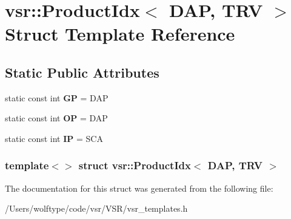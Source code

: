 \hypertarget{structvsr_1_1_product_idx_3_01_d_a_p_00_01_t_r_v_01_4}{\section{vsr\-:\-:Product\-Idx$<$ D\-A\-P, T\-R\-V $>$ Struct Template Reference}
\label{structvsr_1_1_product_idx_3_01_d_a_p_00_01_t_r_v_01_4}
}
\subsection*{Static Public Attributes}
\begin{DoxyCompactItemize}
\item 
\hypertarget{structvsr_1_1_product_idx_3_01_d_a_p_00_01_t_r_v_01_4_a4067d00598e5ca0019542c3eb1e23b21}{static const int {\bfseries G\-P} = D\-A\-P}\label{structvsr_1_1_product_idx_3_01_d_a_p_00_01_t_r_v_01_4_a4067d00598e5ca0019542c3eb1e23b21}

\item 
\hypertarget{structvsr_1_1_product_idx_3_01_d_a_p_00_01_t_r_v_01_4_a0e6cb96a6d7b1090725768a6b373da5b}{static const int {\bfseries O\-P} = D\-A\-P}\label{structvsr_1_1_product_idx_3_01_d_a_p_00_01_t_r_v_01_4_a0e6cb96a6d7b1090725768a6b373da5b}

\item 
\hypertarget{structvsr_1_1_product_idx_3_01_d_a_p_00_01_t_r_v_01_4_a9f386f9134ff0cc6b88bc1379ffae915}{static const int {\bfseries I\-P} = S\-C\-A}\label{structvsr_1_1_product_idx_3_01_d_a_p_00_01_t_r_v_01_4_a9f386f9134ff0cc6b88bc1379ffae915}

\end{DoxyCompactItemize}
\subsubsection*{template$<$$>$ struct vsr\-::\-Product\-Idx$<$ D\-A\-P, T\-R\-V $>$}



The documentation for this struct was generated from the following file\-:\begin{DoxyCompactItemize}
\item 
/\-Users/wolftype/code/vsr/\-V\-S\-R/vsr\-\_\-templates.\-h\end{DoxyCompactItemize}
